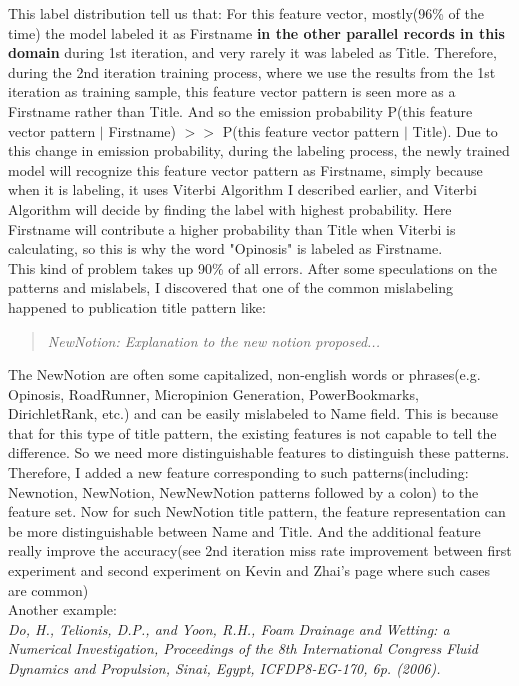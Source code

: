 \documentclass[11pt]{article}
\begin{document}
This label distribution tell us that: For this feature vector, mostly(96\% of the time) the model labeled it as Firstname \textbf{in the other parallel records in this domain} during 1st iteration, and very rarely it was labeled as Title. Therefore, during the 2nd iteration training process, where we use the results from the 1st iteration as training sample, this feature vector pattern is seen more as a Firstname rather than Title. And so the emission probability P(this feature vector pattern $\vert$ Firstname) $>>$ P(this feature vector pattern $\vert$ Title). Due to this change in emission probability, during the labeling process, the newly trained model will recognize this feature vector pattern as Firstname, simply because when it is labeling, it uses Viterbi Algorithm I described earlier, and Viterbi Algorithm will decide by finding the label with highest probability. Here Firstname will contribute a higher probability than Title when Viterbi is calculating, so this is why the word "Opinosis" is labeled as Firstname.\\

This kind of problem takes up 90\% of all errors. After some speculations on the patterns and mislabels, I discovered that one of the common mislabeling happened to publication title pattern like:
\begin{quote}
\textit{NewNotion: Explanation to the new notion proposed...}
\end{quote}

The NewNotion are often some capitalized, non-english words or phrases(e.g. Opinosis, RoadRunner, Micropinion Generation, PowerBookmarks, DirichletRank, etc.) and can be easily mislabeled to Name field. This is because that for this type of title pattern, the existing features is not capable to tell the difference. So we need more distinguishable features to distinguish these patterns. Therefore, I added a new feature corresponding to such patterns(including: Newnotion, NewNotion, NewNewNotion patterns followed by a colon) to the feature set. Now for such NewNotion title pattern, the feature representation can be more distinguishable between Name and Title. And the additional feature really improve the accuracy(see 2nd iteration miss rate improvement between first experiment and second experiment on Kevin and Zhai's page where such cases are common)\\ 

Another example:\\

\textit{Do, H., Telionis, D.P., and Yoon, R.H., Foam Drainage and Wetting: a Numerical Investigation, Proceedings of the 8th International Congress Fluid Dynamics and Propulsion, Sinai, Egypt, ICFDP8-EG-170, 6p. (2006).}\\
\end{document}
